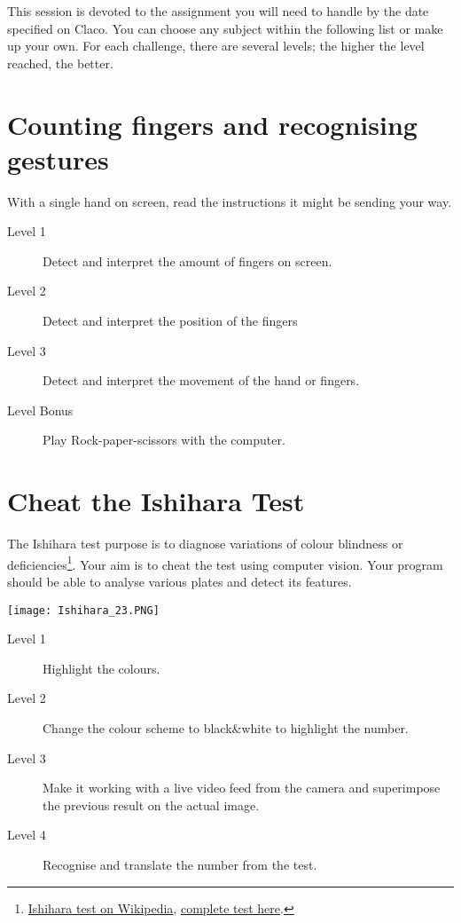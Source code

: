 \documentclass{labo}
\author{}
\begin{document}

This session is devoted to the assignment you will need to handle by the date specified on Claco.
You can choose any subject within the following list or make up your own.
For each challenge, there are several levels; the higher the level reached, the better.


\section*{Counting fingers and recognising gestures}
With a single hand on screen, read the instructions it might be sending your way.

\begin{description}
	\item[Level 1] Detect and interpret the amount of fingers on screen.
	\item[Level 2] Detect and interpret the position of the fingers \faHandPeaceO \faHandSpockO \faHandScissorsO
	\item[Level 3] Detect and interpret the movement of the hand or fingers.
	\item[Level Bonus] Play Rock-paper-scissors with the computer.
\end{description}


\section*{Cheat the Ishihara Test}
The Ishihara test purpose is to diagnose variations of colour blindness or deficiencies\footnote{\href{https://en.wikipedia.org/wiki/Ishihara\_test}{Ishihara test on Wikipedia}, \href{http://daltonien.free.fr/daltonien/article.php3?id_article=6}{complete test here}.}.
Your aim is to cheat the test using computer vision. Your program should be able to analyse various plates and detect its features.

\begin{center}
\texttt{[image: Ishihara\_23.PNG]}
\end{center}

\begin{description}
	\item[Level 1] Highlight the colours.
	\item[Level 2] Change the colour scheme to black\&white to highlight the number.
	\item[Level 3] Make it working with a live video feed from the camera and superimpose the previous result on the actual image.
	\item[Level 4] Recognise and translate the number from the test.
\end{description}
\end{document}

